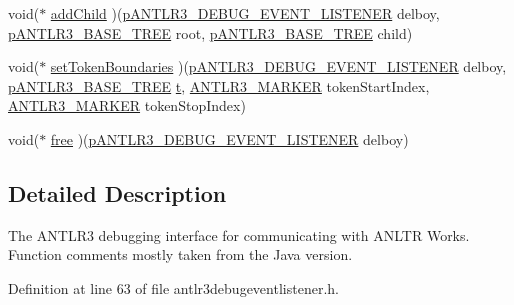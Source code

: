 \begin{DoxyCompactItemize}
\item 
void($\ast$ \hyperlink{struct_a_n_t_l_r3___d_e_b_u_g___e_v_e_n_t___l_i_s_t_e_n_e_r__struct_acc676073bc55a9df74ccc4891f8f9ef5}{add\-Child} )(\hyperlink{antlr3interfaces_8h_ab226a624395fcc0b8fe2b29ae60b6116}{p\-A\-N\-T\-L\-R3\-\_\-\-D\-E\-B\-U\-G\-\_\-\-E\-V\-E\-N\-T\-\_\-\-L\-I\-S\-T\-E\-N\-E\-R} delboy, \hyperlink{antlr3interfaces_8h_a6313a8a3e8f044398a393bd10c083852}{p\-A\-N\-T\-L\-R3\-\_\-\-B\-A\-S\-E\-\_\-\-T\-R\-E\-E} root, \hyperlink{antlr3interfaces_8h_a6313a8a3e8f044398a393bd10c083852}{p\-A\-N\-T\-L\-R3\-\_\-\-B\-A\-S\-E\-\_\-\-T\-R\-E\-E} child)
\item 
void($\ast$ \hyperlink{struct_a_n_t_l_r3___d_e_b_u_g___e_v_e_n_t___l_i_s_t_e_n_e_r__struct_a9b01b22f92c496a1eb48f0d8c1efeae0}{set\-Token\-Boundaries} )(\hyperlink{antlr3interfaces_8h_ab226a624395fcc0b8fe2b29ae60b6116}{p\-A\-N\-T\-L\-R3\-\_\-\-D\-E\-B\-U\-G\-\_\-\-E\-V\-E\-N\-T\-\_\-\-L\-I\-S\-T\-E\-N\-E\-R} delboy, \hyperlink{antlr3interfaces_8h_a6313a8a3e8f044398a393bd10c083852}{p\-A\-N\-T\-L\-R3\-\_\-\-B\-A\-S\-E\-\_\-\-T\-R\-E\-E} \hyperlink{showimage_8m_ad941f6ef920fbfb3d75b60ddbedbdd39}{t}, \hyperlink{antlr3defs_8h_a0361e6bf442e07afe923e4d05e9ebc4f}{A\-N\-T\-L\-R3\-\_\-\-M\-A\-R\-K\-E\-R} token\-Start\-Index, \hyperlink{antlr3defs_8h_a0361e6bf442e07afe923e4d05e9ebc4f}{A\-N\-T\-L\-R3\-\_\-\-M\-A\-R\-K\-E\-R} token\-Stop\-Index)
\item 
void($\ast$ \hyperlink{struct_a_n_t_l_r3___d_e_b_u_g___e_v_e_n_t___l_i_s_t_e_n_e_r__struct_a72d80e00691f7ab256c5e5603cf8f24c}{free} )(\hyperlink{antlr3interfaces_8h_ab226a624395fcc0b8fe2b29ae60b6116}{p\-A\-N\-T\-L\-R3\-\_\-\-D\-E\-B\-U\-G\-\_\-\-E\-V\-E\-N\-T\-\_\-\-L\-I\-S\-T\-E\-N\-E\-R} delboy)
\end{DoxyCompactItemize}


\subsection{Detailed Description}
The A\-N\-T\-L\-R3 debugging interface for communicating with A\-N\-L\-T\-R Works. Function comments mostly taken from the Java version. 

Definition at line 63 of file antlr3debugeventlistener.\-h.



